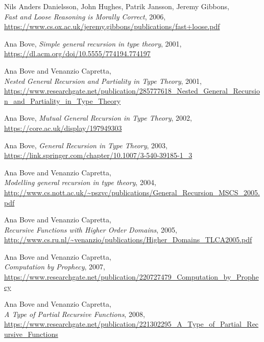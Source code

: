 \documentclass[declaration,mgr,english,shortabstract]{iithesis}
\begin{document}
\begin{thebibliography}{1}
    Nils Anders Danielsson, John Hughes, Patrik Jansson, Jeremy Gibbons, \\
    \textit{Fast and Loose Reasoning is Morally Correct}, 2006, \\
    \url{https://www.cs.ox.ac.uk/jeremy.gibbons/publications/fast+loose.pdf}

    Ana Bove,
    \textit{Simple general recursion in type theory},
    2001, \\
    \url{https://dl.acm.org/doi/10.5555/774194.774197}

    Ana Bove and Venanzio Capretta, \\
    \textit{Nested General Recursion and Partiality in Type Theory},
    2001, \\
    \url{https://www.researchgate.net/publication/285777618_Nested_General_Recursion_and_Partiality_in_Type_Theory}

    Ana Bove,
    \textit{Mutual General Recursion in Type Theory},
    2002, \\
    \url{https://core.ac.uk/display/197949303}

    Ana Bove,
    \textit{General Recursion in Type Theory},
    2003, \\
    \url{https://link.springer.com/chapter/10.1007/3-540-39185-1_3}

    Ana Bove and Venanzio Capretta, \\
    \textit{Modelling general recursion in type theory},
    2004, \\
    \url{http://www.cs.nott.ac.uk/~pszvc/publications/General_Recursion_MSCS_2005.pdf}

    Ana Bove and Venanzio Capretta, \\
    \textit{Recursive Functions with Higher Order Domains},
    2005, \\
    \url{http://www.cs.ru.nl/~venanzio/publications/Higher_Domains_TLCA2005.pdf}

    Ana Bove and Venanzio Capretta, \\
    \textit{Computation by Prophecy},
    2007, \\
    \url{https://www.researchgate.net/publication/220727479_Computation_by_Prophecy}

    Ana Bove and Venanzio Capretta, \\
    \textit{A Type of Partial Recursive Functions},
    2008, \\
    \url{https://www.researchgate.net/publication/221302295_A_Type_of_Partial_Recursive_Functions}


\end{thebibliography}
\end{document}
